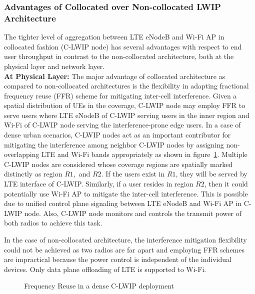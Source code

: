 \documentclass[conference]{IEEEtran}
\begin{document}
\subsubsection{\textbf{Advantages of Collocated over Non-collocated LWIP Architecture}} 
The tighter level of aggregation between LTE eNodeB and Wi-Fi AP in collocated fashion (C-LWIP node) has several advantages with respect to end user throughput in contrast to the non-collocated architecture, both at the physical layer and network layer.
\textbf{\\At Physical Layer:}
The major advantage of collocated architecture as compared to non-collocated architectures is the flexibility in adapting fractional frequency reuse (FFR) scheme for mitigating inter-cell interference. Given a spatial distribution of UEs in the coverage, C-LWIP node may employ FFR to serve users where LTE eNodeB of C-LWIP serving users in the inner region and Wi-Fi of C-LWIP node serving the interference-prone edge users. In a case of dense urban scenarios, C-LWIP nodes act as an important contributor for mitigating the interference among neighbor C-LWIP nodes by assigning non-overlapping LTE and Wi-Fi bands appropriately as shown in figure~\ref{fig:rem}. Multiple C-LWIP nodes are considered whose coverage regions are spatially marked distinctly as region $R1,$ and $R2$. If the users exist in $R1$, they will be served by LTE interface of C-LWIP. Similarly, if a user resides in region $R2$, then it could potentially use Wi-Fi AP to mitigate the inter-cell interference. This is possible due to unified control plane signaling between LTE eNodeB and Wi-Fi AP in C-LWIP node. Also, C-LWIP node monitors and controls the transmit power of both radios to achieve this task.  

In the case of non-collocated architecture, the interference mitigation flexibility could not be achieved as two radios are far apart and employing FFR schemes are impractical because the power control is independent of the individual devices. Only data plane offloading of LTE is supported to Wi-Fi.
\begin{figure}
\centering
{}
\caption{Frequency Reuse in a dense C-LWIP deployment}
\vspace{-0.8cm}
\label{fig:rem}
\end{figure}
\end{document}
